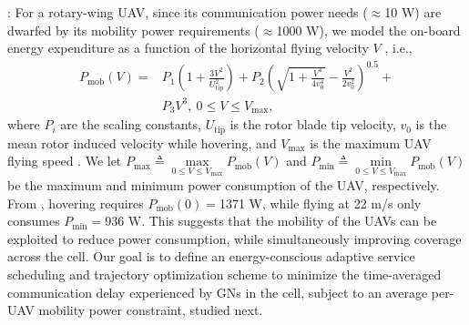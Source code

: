 \documentclass[10pt, twocolumn]{IEEEtran}
\theoremstyle{plain}
\theoremstyle{definition}
\theoremstyle{remark}
\begin{document}
: For a rotary-wing UAV, since its communication power needs ($\approx$10 W) are dwarfed by its mobility power requirements ($\approx$1000 W), we model the on-board energy expenditure as a function of the horizontal flying velocity $V$ \cite{SCA}, i.e., 
\begin{align}\label{eq:Power}
    P_{\mathrm{mob}}(V) = &P_{1}\left(1 + \frac{3 V^{2}}{U_{\mathrm{tip}}^{2}}\right) + P_{2}\left(\sqrt{1 + \frac{V^{4}}{4 v_{0}^{4}}} - \frac{V^{2}}{2 v_{0}^{2}}\right)^{0.5} + \\&P_{3}V^{3},\ 0\leq V\leq V_{\max},
\end{align}
where $P_i$ are the scaling constants, $U_{\mathrm{tip}}$ is the rotor blade tip velocity, $v_{0}$ is the mean rotor induced velocity while hovering, and $V_{\max}$ is the maximum UAV flying speed \cite{SCA}.
We let $P_{\max}\triangleq \underset{0\leq V\leq V_{\max}}{\max}P_{\mathrm{mob}}(V)$ and $P_{\min}\triangleq \underset{0\leq V\leq V_{\max}}{\min}P_{\mathrm{mob}}(V)$ be the maximum and minimum power consumption of the UAV, respectively. From \cite{SCA}, hovering requires $P_{\mathrm{mob}}(0)=$1371 W, while flying at 22 m/s only consumes $P_{\min}=$936 W. This suggests that the mobility of the UAVs can be exploited to reduce power consumption, while simultaneously improving coverage across the cell. Our goal is to define an energy-conscious adaptive service scheduling and trajectory optimization scheme to minimize the time-averaged communication delay experienced by GNs in the cell, subject to an average per-UAV mobility power constraint, studied next.
\vspace{-4mm}
\end{document}
